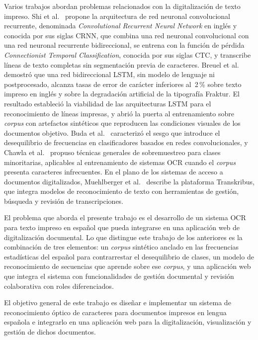 Varios trabajos abordan problemas relacionados con la digitalización de texto impreso. Shi et al.~\cite{shi2016crnn} propone la arquitectura de red neuronal convolucional recurrente, denominada \textit{Convolutional Recurrent Neural Network} en inglés y conocida por sus siglas CRNN, que combina una red neuronal convolucional con una red neuronal recurrente bidireccional, se entrena con la función de pérdida \textit{Connectionist Temporal Classification}, conocida por sus siglas CTC, y transcribe líneas de texto completas sin segmentación previa de caracteres. Breuel et al.~\cite{breuel2013ocropus} demostró que una red bidireccional LSTM, sin modelo de lenguaje ni postprocesado, alcanza tasas de error de carácter inferiores al~2\,\% sobre texto impreso en inglés y sobre la degradación artificial de la tipografía Fraktur. El resultado estableció la viabilidad de las arquitecturas LSTM para el reconocimiento de líneas impresas, y abrió la puerta al entrenamiento sobre \textit{corpus} con artefactos sintéticos que reproducen las condiciones visuales de los documentos objetivo. Buda et al.~\cite{buda2018imbalance} caracterizó el sesgo que introduce el desequilibrio de frecuencias en clasificadores basados en redes convolucionales, y Chawla et al.~\cite{chawla2002smote} propuso técnicas generales de sobremuestreo para clases minoritarias, aplicables al entrenamiento de sistemas OCR cuando el \textit{corpus} presenta caracteres infrecuentes. En el plano de los sistemas de acceso a documentos digitalizados, Muehlberger et al.~\cite{muehlberger2019transkribus} describe la plataforma Transkribus, que integra modelos de reconocimiento de texto con herramientas de gestión, búsqueda y revisión de transcripciones.

El problema que aborda el presente trabajo es el desarrollo de un sistema OCR para texto impreso en español que pueda integrarse en una aplicación web de digitalización documental. Lo que distingue este trabajo de los anteriores es la combinación de tres elementos: un \textit{corpus} sintético anclado en las frecuencias estadísticas del español para contrarrestar el desequilibrio de clases, un modelo de reconocimiento de secuencias que aprende sobre ese \textit{corpus}, y una aplicación web que integra el sistema con funcionalidades de gestión documental y revisión colaborativa con roles diferenciados.

El objetivo general de este trabajo es diseñar e implementar un sistema de reconocimiento óptico de caracteres para documentos impresos en lengua española e integrarlo en una aplicación web para la digitalización, visualización y gestión de dichos documentos.

